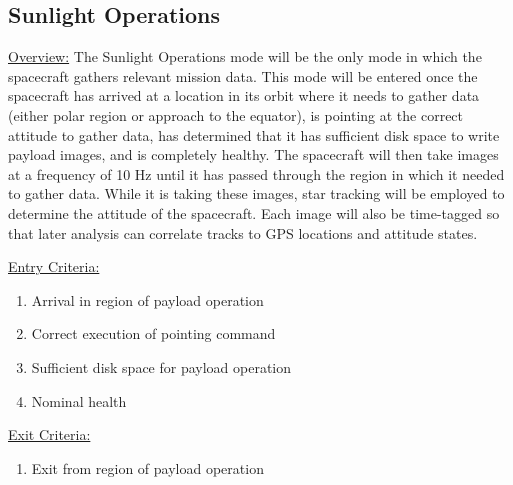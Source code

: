 \documentclass{article}
\begin{document}
\newpage

\subsection{Sunlight Operations}

\underline{Overview:} The Sunlight Operations mode will be the only mode in which the spacecraft gathers relevant mission data. This mode will be entered once the spacecraft has arrived at a location in its orbit where it needs to gather data (either polar region or approach to the equator), is pointing at the correct attitude to gather data, has determined that it has sufficient disk space to write payload images, and is completely healthy. The spacecraft will then take images at a frequency of 10 Hz until it has passed through the region in which it needed to gather data. While it is taking these images, star tracking will be employed to determine the attitude of the spacecraft. Each image will also be time-tagged so that later analysis can correlate tracks to GPS locations and attitude states.

\underline{Entry Criteria:} 

\begin{enumerate}
\item Arrival in region of payload operation
\item Correct execution of pointing command
\item Sufficient disk space for payload operation
\item Nominal health
\end{enumerate}

\underline{Exit Criteria:}

\begin{enumerate}
\item Exit from region of payload operation
\end{enumerate}
\end{document}
